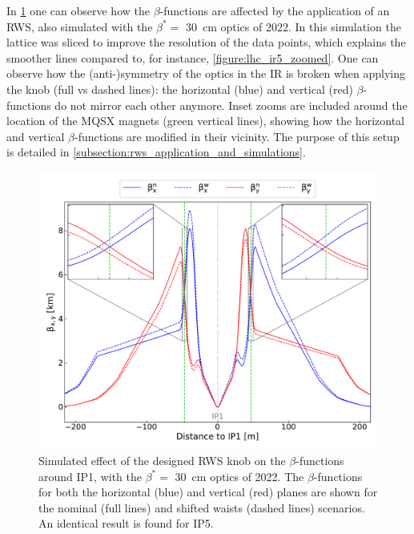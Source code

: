 In \cref{figure:rigid_waist_shift_knob_effect_on_betas} one can observe how the \(\beta\)-functions are affected by the application of an RWS, also simulated with the \(\beta^{\ast} =\) \qty{30}{\centi\metre} optics of \num{2022}.
In this simulation the lattice was sliced to improve the resolution of the data points, which explains the smoother lines compared to, for instance, \cref{figure:lhc_ir5_zoomed}.
One can observe how the (anti-)symmetry of the optics in the IR is broken when applying the knob (full vs dashed lines): the horizontal (\textcolor{mplb}{blue}) and vertical (\textcolor{mplr}{red}) \(\beta\)-functions do not mirror each other anymore.
Inset zooms are included around the location of the MQSX magnets (\textcolor{mqsx_green}{green} vertical lines), showing how the horizontal and vertical \(\beta\)-functions are modified in their vicinity.
The purpose of this setup is detailed in \cref{subsection:rws_application_and_simulations}.

\begin{figure}[!htb]
    \centering
    \includegraphics[width=\textwidth]{Figures/IR_Coupling_Correction/rigid_waist_shift_betas_effect.pdf}
    \caption{Simulated effect of the designed RWS knob on the \(\beta\)-functions around IP\num{1}, with the \(\beta^{\ast} =\) \qty{30}{\centi\metre} optics of \num{2022}. The \(\beta\)-functions for both the horizontal (\textcolor{mplb}{blue}) and vertical (\textcolor{mplr}{red}) planes are shown for the nominal (full lines) and shifted waists (dashed lines) scenarios. An identical result is found for IP\num{5}.}
    \label{figure:rigid_waist_shift_knob_effect_on_betas}
\end{figure}

